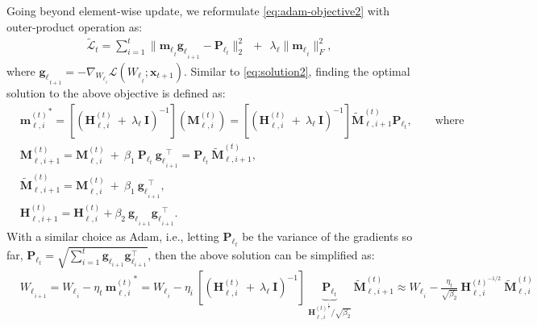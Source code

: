 \documentclass{article}
\newcommand{\undermath}[2]{\underset{#1}{\underbrace{#2}}}
\newcommand{\vg}{\boldsymbol{g}}
\newcommand{\vp}{\boldsymbol{P}}
\begin{document}
{Going beyond element-wise update, we reformulate \autoref{eq:adam-objective2} with outer-product operation as:
\begin{align}\label{eq:adgrad-objective2}
    \tilde{\mathcal{L}}_t = \sum_{i = 1}^{t} \| {\boldsymbol{m}_{\ell}}_{_{t}}   {\boldsymbol{g}_{\ell}}_{_{i + 1}} - \vp_{\ell_{t}} \|_{2}^{2} \:\: +\:\: \lambda_{\ell} \|{\boldsymbol{m}_{\ell}}_{_{t}}\|^2_F ,
\end{align}
where ${\boldsymbol{g}_{\ell}}_{_{t + 1}} = - \nabla_{{W_{\ell}}_{_{t}}} \mathcal{L}\left({W_{\ell}}_{_{t}}; \boldsymbol{x}_{t+1}\right)$. Similar to \autoref{eq:solution2}, finding the optimal solution to the above objective is defined as:
\begin{align}\label{eq:solution-adagrad}
    &{\boldsymbol{m}^{(t)}_{\ell, i}}^{*} = \left[  \left( \boldsymbol{H}^{(t)}_{\ell, i} \: + \: \lambda_{\ell}\: \boldsymbol{I} \right)^{-1}\right]  \left( \boldsymbol{M}^{(t)}_{\ell, i}\right) = \left[  \left( \boldsymbol{H}^{(t)}_{\ell, i} \: + \: \lambda_{\ell}\: \boldsymbol{I} \right)^{-1}\right]  \tilde{\boldsymbol{M}}^{(t)}_{\ell, i+1} \vp_{\ell_{t}}, \qquad \text{where} \\
    &\boldsymbol{M}^{(t)}_{\ell, i+1} = \boldsymbol{M}^{(t)}_{\ell, i} \: + \:  \beta_1 \: \vp_{\ell_{t}} \: {\boldsymbol{g}_{\ell}}_{_{i + 1}}^{\top}   = \vp_{\ell_{t}}  \: \tilde{\boldsymbol{M}}^{(t)}_{\ell, i+1}  ,\\
    &\tilde{\boldsymbol{M}}^{(t)}_{\ell, i+1} = \boldsymbol{M}^{(t)}_{\ell, i} \: + \:  \beta_1 \: {\boldsymbol{g}_{\ell}}_{_{i + 1}}^{\top},\\
    &\boldsymbol{H}^{(t)}_{\ell, i+1} = \boldsymbol{H}^{(t)}_{\ell, i} + \beta_2 \: {\boldsymbol{g}_{\ell}}_{_{i + 1}} {\boldsymbol{g}_{\ell}}_{_{i + 1}}^{\top}.
\end{align}
With a similar choice as Adam, i.e., letting $\vp_{\ell_{t}}$ be the variance of the gradients so far, $\vp_{\ell_{t}} = \sqrt{\sum_{i = 1}^{t} \vg_{\ell_{i+1}} \vg_{\ell_{i+1}}^{\top}}$, then the above solution can be simplified as:
\begin{align}
    &{W_{\ell}}_{_{i+1}} = {W_{\ell}}_{_{i}} - \eta_t \: {\boldsymbol{m}^{(t)}_{\ell, i}}^{*} = {W_{\ell}}_{_{i}} - \eta_i \:  \left[  \left( \boldsymbol{H}^{(t)}_{\ell, i} \: + \: \lambda_{\ell}\: \boldsymbol{I} \right)^{-1}\right] \: \undermath{\boldsymbol{H}^{(t)^{\frac{1}{2}}}_{\ell, i} / \sqrt{\beta_2}}{\vp_{\ell_{t}}} \: \tilde{\boldsymbol{M}}^{(t)}_{\ell, i+1}   \approx {W_{\ell}}_{_{i}} - \frac{\eta_t}{\sqrt{\beta_2}} \: \boldsymbol{H}^{(t)^{-1/2}}_{\ell, i} \:\tilde{\boldsymbol{M}}^{(t)}_{\ell, i}

\end{align}}
\end{document}
